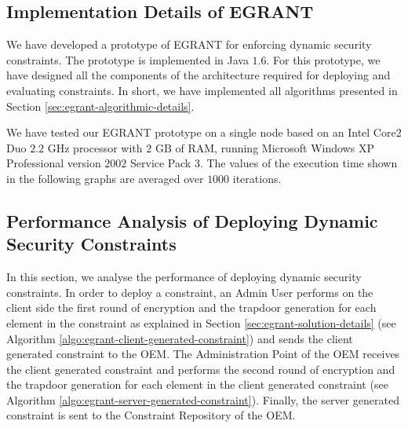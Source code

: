 \documentclass[epsfig,a4paper,11pt,titlepage]{book}
\numberwithin{algorithm}{chapter}
\begin{document}
\subsection[Implementation Details of E-GRANT]{Implementation Details of \gls{EGRANT}}
We have developed a prototype of \gls{EGRANT} for enforcing dynamic security constraints. The prototype is implemented in Java $1.6$. For this prototype, we have designed all the components of the architecture required for deploying and evaluating constraints. In short, we have implemented all algorithms presented in Section \ref{sec:egrant-algorithmic-details}.

We have tested our \gls{EGRANT} prototype on a single node based on an Intel Core2 Duo $2.2$ GHz processor with $2$ GB of RAM, running Microsoft Windows XP Professional version $2002$ Service Pack $3$. The values of the execution time shown in the following graphs are averaged over $1000$ iterations.

\subsection{Performance Analysis of Deploying Dynamic Security Constraints}
In this section, we analyse the performance of deploying dynamic security constraints. In order to deploy a constraint, an Admin User performs on the client side the first round of encryption and the trapdoor generation for each element in the constraint as explained in Section \ref{sec:egrant-solution-details} (see Algorithm \ref{algo:egrant-client-generated-constraint}) and sends the client generated constraint to the \gls{OEM}. The Administration Point of the \gls{OEM} receives the client generated constraint and performs the second round of encryption and the trapdoor generation for each element in the client generated constraint (see Algorithm \ref{algo:egrant-server-generated-constraint}). Finally, the server generated constraint is sent to the Constraint Repository of the \gls{OEM}.
\end{document}
